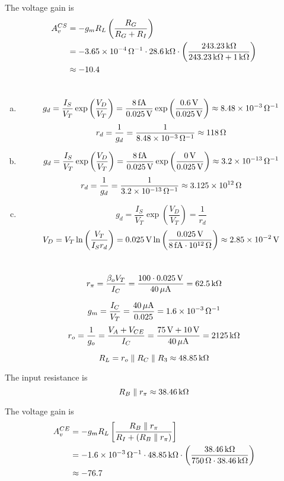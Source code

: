 \documentclass{article}
\newcommand{\unit}[1]{{\rm\,#1}}
\begin{document}
The voltage gain is
\begin{align*}
A_v^{CS}&=-g_mR_L\left(\frac{R_G}{R_G+R_I}\right)\\
&=-3.65\times10^{-4}\unit{\Omega^{-1}}\cdot28.6\unit{k\Omega}\cdot\left(\frac{243.23\unit{k\Omega}}{243.23\unit{k\Omega}+1\unit{k\Omega}}\right)\\
&\approx-10.4
\end{align*}

\section{}
\begin{enumerate}[(a)]
\item $$g_d=\frac{I_S}{V_T}\exp\left(\frac{V_D}{V_T}\right)=\frac{8\unit{fA}}{0.025\unit{V}}\exp\left(\frac{0.6\unit{V}}{0.025\unit{V}}\right)\approx8.48\times10^{-3}\unit{\Omega^{-1}}$$
$$r_d=\frac{1}{g_d}=\frac{1}{8.48\times10^{-3}\unit{\Omega^{-1}}}\approx118\unit{\Omega}$$
\item $$g_d=\frac{I_S}{V_T}\exp\left(\frac{V_D}{V_T}\right)=\frac{8\unit{fA}}{0.025\unit{V}}\exp\left(\frac{0\unit{V}}{0.025\unit{V}}\right)\approx3.2\times10^{-13}\unit{\Omega^{-1}}$$
$$r_d=\frac{1}{g_d}=\frac{1}{3.2\times10^{-13}\unit{\Omega^{-1}}}\approx3.125\times10^{12}\unit{\Omega}$$
\item $$g_d=\frac{I_S}{V_T}\exp\left(\frac{V_D}{V_T}\right)=\frac{1}{r_d}$$
$$V_D=V_T\ln\left(\frac{V_T}{I_Sr_d}\right)=0.025\unit{V}\ln\left(\frac{0.025\unit{V}}{8\unit{fA}\cdot10^{12}\unit{\Omega}}\right)\approx2.85\times10^{-2}\unit{V}$$
\end{enumerate}

\section{}
$$r_\pi=\frac{\beta_oV_T}{I_C}=\frac{100\cdot0.025\unit{V}}{40\unit{\mu A}}=62.5\unit{k\Omega}$$

$$g_m=\frac{I_C}{V_T}=\frac{40\unit{\mu A}}{0.025}=1.6\times10^{-3}\unit{\Omega^{-1}}$$
$$r_o=\frac{1}{g_o}=\frac{V_A+V_{CE}}{I_C}=\frac{75\unit{V}+10\unit{V}}{40\unit{\mu A}}=2125\unit{k\Omega}$$

$$R_L=r_o\parallel R_C\parallel R_3\approx48.85\unit{k\Omega}$$

The input resistance is
$$R_B\parallel r_\pi\approx38.46\unit{k\Omega}$$

The voltage gain is
\begin{align*}
A_v^{CE}&=-g_mR_L\left[\frac{R_B\parallel r_\pi}{R_I+(R_B\parallel r_\pi)}\right]\\
&=-1.6\times10^{-3}\unit{\Omega^{-1}}\cdot48.85\unit{k\Omega}\cdot\left(\frac{38.46\unit{k\Omega}}{750\unit{\Omega}\cdot38.46\unit{k\Omega}}\right)\\
&\approx-76.7
\end{align*}
\end{document}
